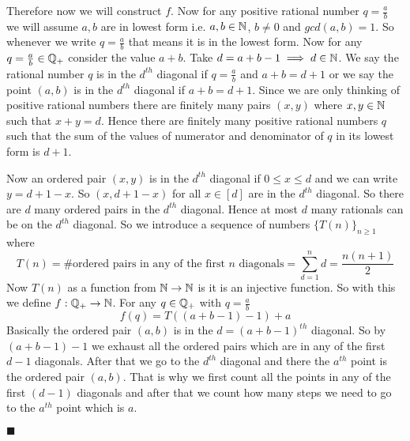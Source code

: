 \documentclass[a4paper, 11pt]{article}
\renewenvironment{proof}{\noindent{\it \textbf{Proof:}}\hspace*{1em}}{\hfill $\blacksquare$\bigskip\\}
\begin{document}
{\begin{itemize}
\begin{proof}
Therefore now we will construct $f$. Now for any positive rational number $q=\frac{a}{b}$ we will assume $a,b$ are in lowest form i.e. $a,b\in\mathbb{N}$, $b\neq 0$ and $gcd(a,b)=1$. So whenever we write $q=\frac{a}{b}$ that means it is in the lowest form. Now for any $q=\frac{a}{b}\in\mathbb{Q}_+$ consider the value $a+b$. Take $d=a+b-1\implies d\in\mathbb{N}$. We say the rational number $q$ is in the $d^{th}$ diagonal if $q=\frac{a}{b}$ and $a+b=d+1$ or we say the point $(a,b)$ is in the $d^{th}$ diagonal if $a+b=d+1$. Since we are only thinking of positive rational numbers there are finitely many pairs $(x,y)$ where $x,y\in\mathbb{N}$ such that $x+y=d$. Hence there are finitely many positive rational numbers $q$ such that the sum of the values of numerator and denominator of $q$ in its lowest form is $d+1$. 

Now an ordered pair $(x,y)$ is in the $d^{th}$ diagonal if $0\leq x\leq d$ and we can write $y=d+1-x$. So $(x,d+1-x)$ for all $x\in[d]$ are in the $d^{th}$ diagonal. So there are $d$ many ordered pairs in the $d^{th}$ diagonal. Hence at most $d$ many rationals can be on the $d^{th}$ diagonal. So we introduce a sequence of numbers $\{T(n)\}_{n\geq 1}$ where $$T(n)=\#\text{ordered pairs in any of the first $n$ diagonals}=\sum_{d=1}^nd=\frac{n(n+1)}2$$Now $T(n)$ as a function from $\mathbb{N}\to \mathbb{N}$ is it is an injective function. So with this we define $f:\mathbb{Q}_+\to\mathbb{N}$. For any $q\in\mathbb{Q}_+$ with $q=\frac{a}{b}$ $$f(q)=T((a+b-1)-1)+a$$Basically the ordered pair $(a,b)$ is in the $d=(a+b-1)^{th}$ diagonal. So by $(a+b-1)-1$ we exhaust all the ordered pairs which are in any of the first $d-1$ diagonals. After that we go to the $d^{th}$ diagonal and there the $a^{th}$ point is the ordered pair $(a,b)$. That is why we first count all the points in any of the first $(d-1)$ diagonals and after that we count how many steps we need to go to the $a^{th}$ point which is $a$.


\end{proof}
\end{itemize}}
\end{document}
